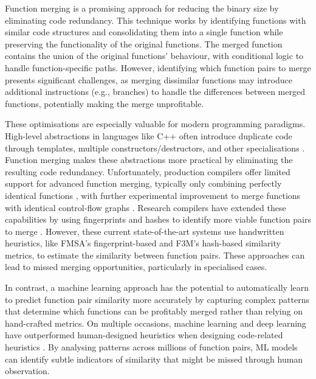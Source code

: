 
Function merging is a promising approach for reducing the binary size by eliminating code redundancy. This technique works by identifying functions with similar code structures and consolidating them into a single function while preserving the functionality of the original functions. The merged function contains the union of the original functions' behaviour, with conditional logic to handle function-specific paths. However, identifying which function pairs to merge presents significant challenges, as merging dissimilar functions may introduce additional instructions (e.g., branches) to handle the differences between merged functions, potentially making the merge unprofitable.

These optimisations are especially valuable for modern programming paradigms. High-level abstractions in languages like C++ often introduce duplicate code through templates, multiple constructors/destructors, and other specialisations \cite{CPPTemplateCodeDuplication}. Function merging makes these abstractions more practical by eliminating the resulting code redundancy. Unfortunately, production compilers offer limited support for advanced function merging, typically only combining perfectly identical functions \cite{LLVMMergeFunctionsPass}, with further experimental improvement to merge functions with identical control-flow graphs \cite{FunctionMergingIsomorphicCFG}. Research compilers have extended these capabilities by using fingerprints and hashes to identify more viable function pairs to merge \cite{FunctionMergingSequenceAlignment, F3M:FastFocusedFunctionMerging}. However, these current state-of-the-art systems use handwritten heuristics, like FMSA's fingerprint-based and F3M's hash-based similarity metrics, to estimate the similarity between function pairs. These approaches can lead to missed merging opportunities, particularly in specialised cases.

In contrast, a machine learning approach has the potential to automatically learn to predict function pair similarity more accurately by capturing complex patterns that determine which functions can be profitably merged rather than relying on hand-crafted metrics. On multiple occasions, machine learning and deep learning have outperformed human-designed heuristics when designing code-related heuristics \cite{GPUCompilerML, RegisterAllocationRL, LoopUnrollingML}. By analysing patterns across millions of function pairs, ML models can identify subtle indicators of similarity that might be missed through human observation.

